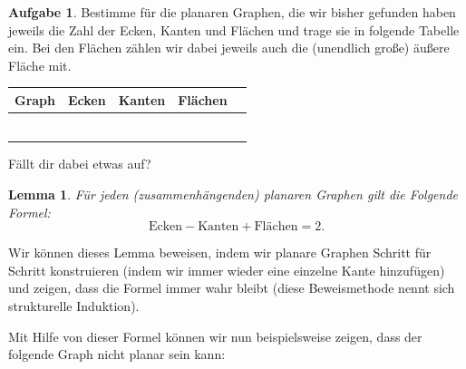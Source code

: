 \documentclass[a4paper,ngerman,12pt]{scrartcl}
\theoremstyle{definition}
\newtheorem{aufg}{Aufgabe}
\theoremstyle{plain}
\newtheorem{lemma}[defn]{Lemma}
\theoremstyle{remark}
\begin{document}
\begin{aufg}
	Bestimme für die planaren Graphen, die wir bisher gefunden haben jeweils die Zahl der Ecken, Kanten und Flächen und trage sie in folgende Tabelle ein. Bei den Flächen zählen wir dabei jeweils auch die (unendlich große) äußere Fläche mit.
	\begin{center}\renewcommand{\arraystretch}{1.5}
		\begin{tabular}{c||c|c|c||c}
			\hspace{3em}Graph\hspace{3em} & Ecken & Kanten & Flächen & \phantom{Ergebnis}\\\hline
			 & & & & \\
			  & & & & \\
			   & & & & \\
			    & & & & \\
			     & & & & \\
			      & & & & \\
		\end{tabular}
	\end{center}
	Fällt dir dabei etwas auf? 
\end{aufg}

\begin{lemma}\label{lemma:EulerCharakteristik}
	Für jeden (zusammenhängenden) planaren Graphen gilt die Folgende Formel:
		\[\text{Ecken} - \text{Kanten} + \text{Flächen} = 2.\]
\end{lemma}

Wir können dieses Lemma beweisen, indem wir planare Graphen Schritt für Schritt konstruieren (indem wir immer wieder eine einzelne Kante hinzufügen) und zeigen, dass die Formel immer wahr bleibt (diese Beweismethode nennt sich \glqq strukturelle Induktion\grqq).

Mit Hilfe von dieser Formel können wir nun beispielsweise zeigen, dass der folgende Graph nicht planar sein kann:
\begin{center}
\end{center}
\end{document}
